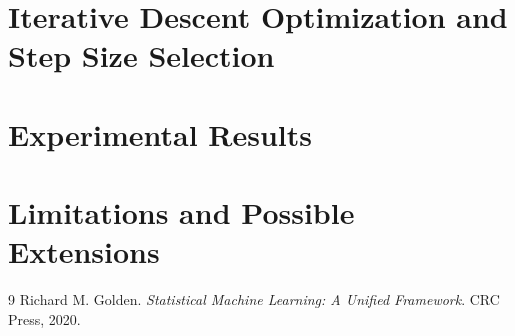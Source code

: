 \documentclass{article}
\begin{document}
\section{Iterative Descent Optimization and Step Size Selection}

%
%
%
%
%
%
%

\section{Experimental Results}

%
%
%

\section{Limitations and Possible Extensions}

%
%

\begin{thebibliography}{9}
Richard M. Golden.
\textit{Statistical Machine Learning: A Unified Framework}.
CRC Press, 2020.
\end{thebibliography}
\end{document}
